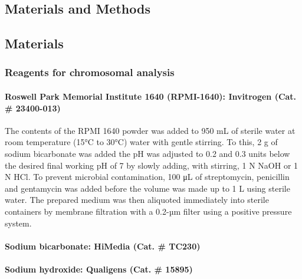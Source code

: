 \begin{refsection}
\chapter{Materials and Methods} %

\label{Chapter2} %



\section{Materials}

\subsection{Reagents for chromosomal analysis}
 \begin{sloppypar}\subsubsection{Roswell Park Memorial Institute 1640 (RPMI-1640): \textmd{Invitrogen (Cat. \# 23400-013)}} \end{sloppypar}
The contents of the RPMI 1640 powder was added to 950 mL of sterile water at room temperature (15°C to 30°C) water with gentle stirring. To this, 2 g of sodium bicarbonate was added the pH was adjusted to 0.2 and 0.3 units below the desired final working pH of 7 by slowly adding, with stirring, 1 N NaOH or 1 N HCl. To prevent microbial contamination, 100 μL of streptomycin, penicillin and gentamycin was added before the volume was made up to 1 L using sterile water. The prepared medium was then aliquoted immediately into sterile containers by membrane filtration with a 0.2-µm filter using a positive pressure system.
\subsubsection{Sodium bicarbonate: \textmd{HiMedia (Cat. \# TC230)}}
\subsubsection{Sodium hydroxide: \textmd{Qualigens (Cat. \# 15895)}}

\end{refsection}

